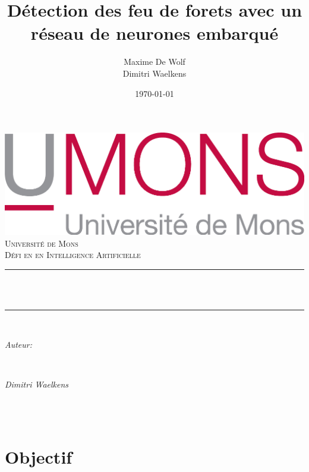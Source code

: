 \documentclass[10pt,a4paper]{article}
\title{Détection des feu de forets avec un réseau de neurones embarqué}                             %
\author{Maxime De Wolf\\
		Dimitri Waelkens}                               %
\date{\today}                                           %
\makeatletter
\let\thetitle\@title
\let\theauthor\@author
\let\thedate\@date
\makeatother
\begin{document}
   	
   	
   	\begin{titlepage}
   		\centering
   		\vspace*{0.5 cm}
   		\includegraphics[scale = 0.75]{UMONS}\\[1.0 cm]   %
   		\textsc{\LARGE Université de Mons}\\[2.0 cm]   %
   		\textsc{\large Défi en en Intelligence Artificielle}\\[0.5 cm]               %
   		\rule{\linewidth}{0.2 mm} \\[0.4 cm]
   		{ \huge \bfseries \thetitle}\\
   		\rule{\linewidth}{0.2 mm} \\[1.5 cm]
   		
   		\begin{minipage}{0.4\textwidth}
   			\begin{flushleft} \large
   				\emph{Auteur:}\\
   				\theauthor
   			\end{flushleft}
   		\end{minipage}~
   		\begin{minipage}{0.4\textwidth}
   			\begin{flushright} \large
   				\emph{Dimitri Waelkens}                                  %
   			\end{flushright}
   		\end{minipage}\\[2 cm]
   		
   		{\large \thedate}\\[2 cm]
   		
   		\vfill
   		
   	\end{titlepage}
   	
   	\section{Objectif}
   	
\end{document}
